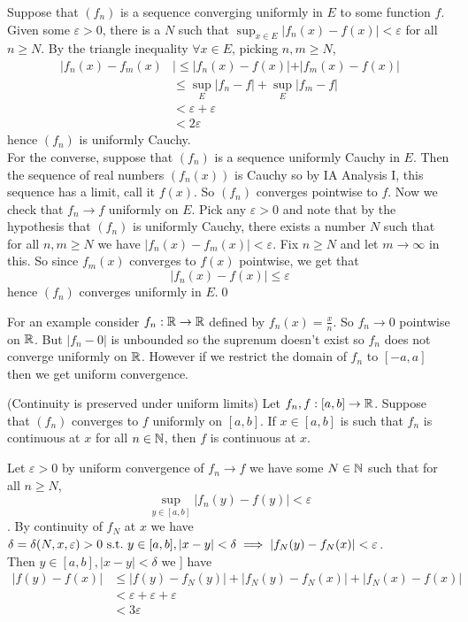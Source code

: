 \documentclass{article}
\newcommand{\eps}{\varepsilon}
\begin{document}
\pf Suppose that $ (f_n) $ is a sequence converging uniformly in $ E $ to some function $ f $. Given some $ \eps>0 $, there is a $ N $ such that $ \sup_{x\in E}|f_n(x)-f(x)|<\eps $ for all $ n\ge N $. By the triangle inequality $ \forall x\in E $, picking $ n,m\ge N $,
\begin{align*}
	|f_n(x)-f_m(x) & |\le |f_n(x)-f(x)|+|f_m(x)-f(x)| \\
 & \le \sup_E|f_n-f|+\sup_E|f_m-f| \\
 & < \eps + \eps\\
 & < 2\eps
\end{align*}
hence $ (f_n) $ is uniformly Cauchy.\\
For the converse, suppose that $ (f_n) $ is a sequence uniformly Cauchy in $ E $. Then the sequence of real numbers $ (f_n(x)) $ is Cauchy so by IA Analysis I, this sequence has a limit, call it $ f(x) $. So $ (f_n) $ converges pointwise to $ f $. Now we check that $ f_n\to f $ uniformly on $ E $. Pick any $ \eps >0 $ and note that by the hypothesis that $ (f_n) $ is uniformly Cauchy, there exists a number $ N $ such that for all $ n,m\ge N $ we have $ |f_n(x)-f_m(x)|<\eps $. Fix $ n\ge N $ and let $ m\to\infty $ in this. So since $ f_m(x) $ converges to $ f(x) $ pointwise, we get that
\[
  |f_n(x)-f(x)|\le \eps
\]
hence $ (f_n) $ converges uniformly in $ E $.\qed\par
For an example consider $ f_n:\mathbb{R}\to\mathbb{R} $ defined by $ f_n(x)=\frac x n $. So $ f_n\to 0 $ pointwise on $ \mathbb{R} $. But $ |f_n-0| $ is unbounded so the suprenum doesn't exist so $ f_n $ does not converge uniformly on $ \mathbb{R} $. However if we restrict the domain of $ f_n $ to $ [-a,a] $ then we get uniform convergence.
\begin{theorem}
	(Continuity is preserved under uniform limits) Let $ f_n,f:[a, b]\to \mathbb{R} $. Suppose that $ (f_n) $ converges to $ f $ uniformly on $ [a,b] $. If $ x\in [a,b] $ is such that $ f_n $ is continuous at $ x $ for all $ n\in \mathbb{N} $, then $ f $ is continuous at $ x $.
\end{theorem}
\pf Let $ \eps>0 $ by uniform convergence of $ f_n\to f $ we have some $ N\in \mathbb{N} $ such that for all $ n\ge N $,
\[
	\sup_{y\in[a,b]}|f_n(y)-f(y)|<\eps
\].
By continuity of $ f_N $ at $ x $ we have $ \delta=\delta(N,x,\eps)>0 \st y\in[a,b], |x-y|<\delta\implies |f_N(y)-f_N(x)|<\eps $.\\
Then $ y\in[a,b], |x-y|<\delta $ we ] have
\begin{align*}
	|f(y)-f(x)| & \le |f(y)-f_N(y)|+|f_N(y)-f_N(x)|+|f_N(x)-f(x)|\\
         & < \eps + \eps +\eps\\
	 & < 3\eps
\end{align*}
\end{document}
